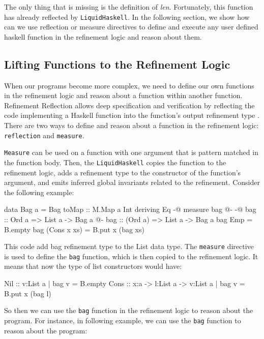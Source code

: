 \documentclass[]{rptuseminar}
\begin{document}
The only thing that is missing is the definition of \textit{len}. Fortunately, this function has already reflected by
\texttt{LiquidHaskell}. In the following section, we show how can we use reflection or measure directives to define and execute any user defined haskell function in the refinement logic and
reason about them.

\subsection{Lifting Functions to the Refinement Logic}
When our programs become more complex, we need to define our own functions in the refinement logic and reason about
a function within another function. Refinement Reflection allows deep specification and verification by 
reflecting the code implementing a Haskell function into the function’s output refinement type \cite{niki_blog_2016}.
There are two ways to define and reason about a function in the refinement logic: \texttt{reflection} and \texttt{measure}. 

\texttt{Measure} can be used on a function with one argument that is pattern matched in the function body. Then, the
\texttt{LiquidHaskell} copies the function to the refinement logic, adds a refinement type to the constructor of the function's argument, and emits inferred global
invariants related to the refinement. Consider the following example:

\begin{haskell}
data Bag a = Bag { toMap :: M.Map a Int } deriving Eq
{-@ measure bag @-}
{-@ bag :: Ord a => List a -> Bag a @-}
bag :: (Ord a) => List a -> Bag a
bag Emp = B.empty
bag (Cons x xs) = B.put x (bag xs)
\end{haskell}

This code add bag refinement type to the List data type. The \texttt{measure} directive is used to define the \texttt{bag} function,
which is then copied to the refinement logic. It means that now the type of list constructors would have:

\begin{haskell}
Nil  :: {v:List a | bag v = B.empty}
Cons :: x:a -> l:List a -> {v:List a | bag v = B.put x (bag l)}
\end{haskell}

So then we can use the \texttt{bag} function in the refinement logic to reason about the program. 
For instance, in following example, we can use the \texttt{bag} function to reason about the program:
\end{document}
